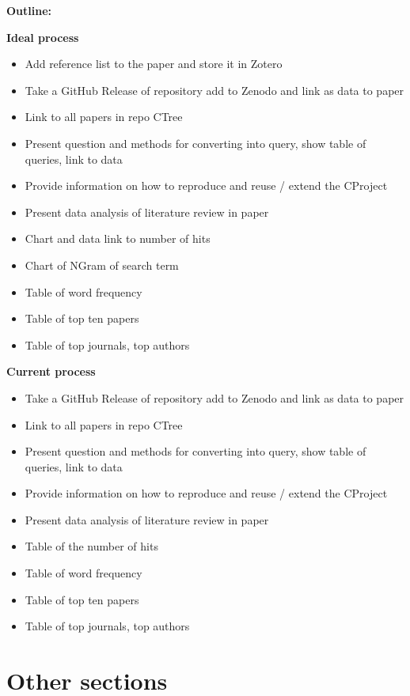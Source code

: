 \documentclass[
  letterpaper,
  DIV=11,
  numbers=noendperiod]{scrreprt}
\providecommand{\tightlist}{%
  \setlength{\itemsep}{0pt}\setlength{\parskip}{0pt}}\usepackage{longtable,booktabs,array}
\begin{document}
\textbf{Outline:}

\textbf{Ideal process}

\begin{itemize}
\tightlist
\item
  Add reference list to the paper and store it in Zotero
\item
  Take a GitHub Release of repository add to Zenodo and link as data to
  paper
\item
  Link to all papers in repo CTree
\item
  Present question and methods for converting into query, show table of
  queries, link to data
\item
  Provide information on how to reproduce and reuse / extend the
  CProject
\item
  Present data analysis of literature review in paper
\item
  Chart and data link to number of hits
\item
  Chart of NGram of search term
\item
  Table of word frequency
\item
  Table of top ten papers
\item
  Table of top journals, top authors
\end{itemize}

\textbf{Current process}

\begin{itemize}
\tightlist
\item
  Take a GitHub Release of repository add to Zenodo and link as data to
  paper
\item
  Link to all papers in repo CTree
\item
  Present question and methods for converting into query, show table of
  queries, link to data
\item
  Provide information on how to reproduce and reuse / extend the
  CProject
\item
  Present data analysis of literature review in paper
\item
  Table of the number of hits
\item
  Table of word frequency
\item
  Table of top ten papers
\item
  Table of top journals, top authors
\end{itemize}

\section{Other sections}\label{other-sections}
\end{document}
